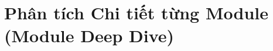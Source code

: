 \documentclass[12pt, a4paper]{article}
\begin{document}
\maketitle
\tableofcontents
\newpage




\section{Phân tích Chi tiết từng Module (Module Deep Dive)}
\label{sec:module-deep-dive}










\end{document}
